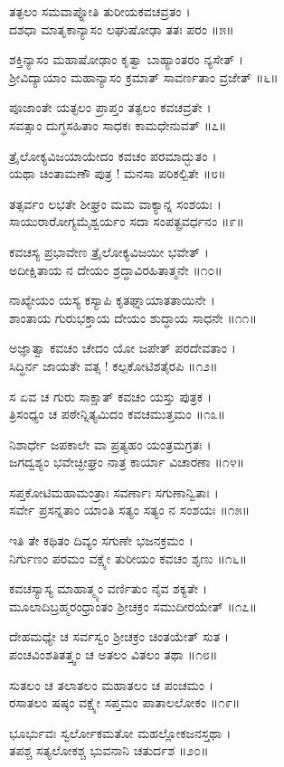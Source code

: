 ತತ್ಫಲಂ ಸಮವಾಪ್ನೋತಿ ತುರೀಯಕವಚವ್ರತಂ ।\\
ದಶಧಾ ಮಾತೃಕಾನ್ಯಾಸಂ ಲಘುಷೋಢಾ ತತಃ ಪರಂ ॥೫॥

ಶಕ್ತಿನ್ಯಾಸಂ ಮಹಾಷೋಢಾಂ ಕೃತ್ವಾ ಬಾಹ್ಯಾಂತರಂ ನ್ಯಸೇತ್ ।\\
ಶ್ರೀವಿದ್ಯಾಯಾಂ ಮಹಾನ್ಯಾಸಂ ಕ್ರಮಾತ್ ಸಾವರ್ಣತಾಂ ವ್ರಜೇತ್ ॥೬॥

ಪೂಜಾಂತೇ ಯತ್ಫಲಂ ಪ್ರಾಪ್ತಂ ತತ್ಫಲಂ ಕವಚವ್ರತೇ ।\\
ಸವತ್ಸಾಂ ದುಗ್ಧಸಹಿತಾಂ ಸಾಧಕಃ ಕಾಮಧೇನುವತ್ ॥೭॥

ತ್ರೈಲೋಕ್ಯವಿಜಯಾಯೇದಂ ಕವಚಂ ಪರಮಾದ್ಭುತಂ ।\\
ಯಥಾ ಚಿಂತಾಮಣೌ ಪುತ್ರ ! ಮನಸಾ ಪರಿಕಲ್ಪಿತೇ ॥೮॥

ತತ್ಸರ್ವಂ ಲಭತೇ ಶೀಘ್ರಂ ಮಮ ವಾಕ್ಯಾನ್ನ ಸಂಶಯಃ ।\\
ಸಾಯುರಾರೋಗ್ಯಮೈಶ್ವರ್ಯಂ ಸದಾ ಸಂಪತ್ಪ್ರವರ್ಧನಂ ॥೯॥

ಕವಚಸ್ಯ ಪ್ರಭಾವೇಣ ತ್ರೈಲೋಕ್ಯವಿಜಯೀ ಭವೇತ್ ।\\
ಅದೀಕ್ಷಿತಾಯ ನ ದೇಯಂ ಶ್ರದ್ಧಾವಿರಹಿತಾತ್ಮನೇ ॥೧೦॥

ನಾಖ್ಯೇಯಂ ಯಸ್ಯ ಕಸ್ಯಾಪಿ ಕೃತಘ್ನಾಯಾತತಾಯಿನೇ ।\\
ಶಾಂತಾಯ ಗುರುಭಕ್ತಾಯ ದೇಯಂ ಶುದ್ಧಾಯ ಸಾಧನೇ ॥೧೧॥

ಅಜ್ಞಾತ್ವಾ ಕವಚಂ ಚೇದಂ ಯೋ ಜಪೇತ್ ಪರದೇವತಾಂ ।\\
ಸಿದ್ಧಿರ್ನ ಜಾಯತೇ ವತ್ಸ ! ಕಲ್ಪಕೋಟಿಶತೈರಪಿ ॥೧೨॥

ಸ ಏವ ಚ ಗುರು ಸಾಕ್ಷಾತ್ ಕವಚಂ ಯಸ್ತು ಪುತ್ರಕ ।\\
ತ್ರಿಸಂಧ್ಯಂ ಚ ಪಠೇನ್ನಿತ್ಯಮಿದಂ ಕವಚಮುತ್ತಮಂ ॥೧೩॥

ನಿಶಾರ್ಧೇ ಜಪಕಾಲೇ ವಾ ಪ್ರತ್ಯಹಂ ಯಂತ್ರಮಗ್ರತಃ ।\\
ಜಗದ್ವಶ್ಯಂ ಭವೇಚ್ಛೀಘ್ರಂ ನಾತ್ರ ಕಾರ್ಯಾ ವಿಚಾರಣಾ ॥೧೪॥

ಸಪ್ತಕೋಟಿಮಹಾಮಂತ್ರಾಃ ಸವರ್ಣಾಃ ಸಗುಣಾನ್ವಿತಾಃ ।\\
ಸರ್ವೇ ಪ್ರಸನ್ನತಾಂ ಯಾಂತಿ ಸತ್ಯಂ ಸತ್ಯಂ ನ ಸಂಶಯಃ ॥೧೫॥

ಇತಿ ತೇ ಕಥಿತಂ ದಿವ್ಯಂ ಸಗುಣೇ ಭಜನಕ್ರಮಂ ।\\
ನಿರ್ಗುಣಂ ಪರಮಂ ವಕ್ಷ್ಯೇ ತುರೀಯಂ ಕವಚಂ ಶೃಣು ॥೧೬॥

ಕವಚಸ್ಯಾಸ್ಯ ಮಾಹಾತ್ಮ್ಯಂ ವರ್ಣಿತುಂ ನೈವ ಶಕ್ಯತೇ ।\\
ಮೂಲಾದಿಬ್ರಹ್ಮರಂಧ್ರಾಂತಂ ಶ್ರೀಚಕ್ರಂ ಸಮುದೀರಯೇತ್ ॥೧೭॥

ದೇಹಮಧ್ಯೇ ಚ ಸರ್ವಸ್ವಂ ಶ್ರೀಚಕ್ರಂ ಚಿಂತಯೇತ್ ಸುತ ।\\
ಪಂಚವಿಂಶತಿತತ್ತ್ವಂ ಚ ಅತಲಂ ವಿತಲಂ ತಥಾ ॥೧೮॥

ಸುತಲಂ ಚ ತಲಾತಲಂ ಮಹಾತಲಂ ಚ ಪಂಚಮಂ ।\\
ರಸಾತಲಂ ಷಷ್ಠಂ ವಕ್ಷ್ಯೇ ಸಪ್ತಮಂ ಪಾತಾಲಲೋಕಂ ॥೧೯॥

ಭೂರ್ಭುವಃ ಸ್ವರ್ಲೋಕಮತೋ ಮಹಲ್ಲೋಕಜನಸ್ತಥಾ ।\\
ತಪಶ್ಚ ಸತ್ಯಲೋಕಶ್ಚ ಭುವನಾನಿ ಚತುರ್ದಶ ॥೨೦॥

